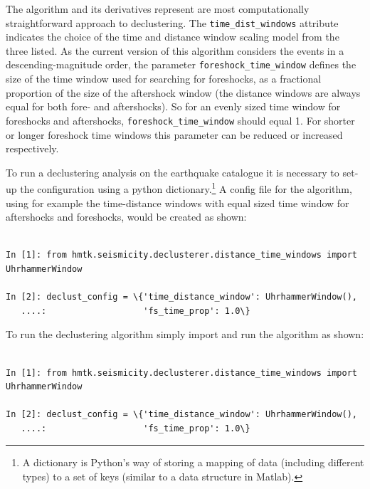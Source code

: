 The \cite{GardnerKnopoff1974} algorithm and its derivatives represent 
are most computationally straightforward approach to declustering. The \verb=time_dist_windows= attribute indicates the choice of the 
time and distance window scaling model from the three listed. As 
the current version of this algorithm considers the events in a 
descending-magnitude order, the parameter \verb=foreshock_time_window= 
defines the size of the time window used for searching for foreshocks, 
as a fractional proportion of the size of the aftershock window (the 
distance windows are always equal for both fore- and aftershocks). 
So for an evenly sized time window for foreshocks and aftershocks, 
\verb=foreshock_time_window= should equal 1. For shorter or longer 
foreshock time windows this parameter can be reduced or increased respectively.

To run a declustering analysis on the earthquake catalogue it is necessary to set-up the configuration using a python dictionary.\footnote{A dictionary is Python's way of storing a mapping of data (including different types) to a set of keys (similar to a data structure in Matlab).} A config file for the \cite{GardnerKnopoff1974} algorithm, using for example the \cite{Uhrhammer1986} time-distance windows with equal sized time window for aftershocks and foreshocks, would be created as shown:

\begin{Verbatim}[frame=single, commandchars=\\\{\}, fontsize=\scriptsize, samepage=true]

In [1]: from hmtk.seismicity.declusterer.distance_time_windows import UhrhammerWindow

In [2]: declust_config = \{'time_distance_window': UhrhammerWindow(),
   ....:                   'fs_time_prop': 1.0\}

\end{Verbatim}


To run the declustering algorithm simply import and run the algorithm as shown:

\begin{Verbatim}[frame=single, commandchars=\\\{\}, fontsize=\scriptsize, samepage=true]

In [1]: from hmtk.seismicity.declusterer.distance_time_windows import UhrhammerWindow

In [2]: declust_config = \{'time_distance_window': UhrhammerWindow(),
   ....:                   'fs_time_prop': 1.0\}

\end{Verbatim}


